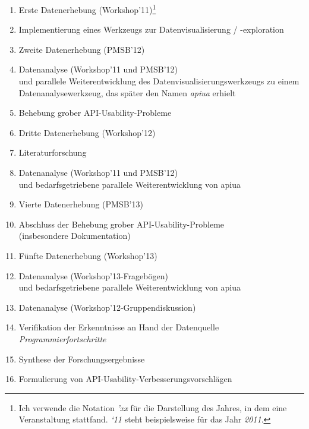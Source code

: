 \begin{enumerate}
  \item Erste Datenerhebung (Workshop'11)\footnote{Ich verwende die Notation \textit{'xx} für die Darstellung des Jahres, in dem eine Veranstaltung stattfand. \textit{`11} steht beispielsweise für das Jahr \textit{2011}.}
  \item Implementierung eines Werkzeugs zur Datenvisualisierung / -exploration 
  \item Zweite Datenerhebung (PMSB'12)
  \item Datenanalyse (Workshop'11 und PMSB'12)\\und parallele Weiterentwicklung des Datenvisualisierungswerkzeugs zu einem Datenanalysewerkzeug, das später den Namen \textit{\gls{apiua}} erhielt
  \item Behebung grober API-Usability-Probleme
  \item Dritte Datenerhebung (Workshop'12)
  \item Literaturforschung
  \item Datenanalyse (Workshop'11 und PMSB'12)\\und bedarfsgetriebene parallele Weiterentwicklung von \gls{apiua}
  \item Vierte Datenerhebung (PMSB'13)
  \item Abschluss der Behebung grober API-Usability-Probleme\\(insbesondere Dokumentation)
  \item Fünfte Datenerhebung (Workshop'13)
  \item Datenanalyse (Workshop'13-Fragebögen)\\und bedarfsgetriebene parallele Weiterentwicklung von \gls{apiua}
  \item Datenanalyse (Workshop'12-Gruppendiskussion)
  \item Verifikation der Erkenntnisse an Hand der Datenquelle \textit{Programmierfortschritte}
  \item Synthese der Forschungsergebnisse
  \item Formulierung von API-Usability-Verbesserungsvorschlägen
\end{enumerate}

